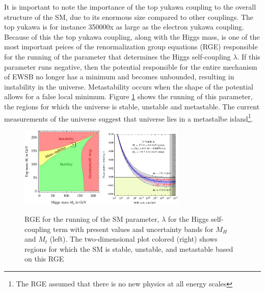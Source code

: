 It is important to note the importance of the top yukawa coupling
to the overall structure of the SM, due to its enormous size compared
to other couplings. The top yukawa is for instance 350000x as large as the electron
yukawa coupling. Because of this the top yukawa coupling,
along with the Higgs mass, is one of the most important peices of the renormalization group equations (RGE)
responsible for the running of the parameter that determines the Higgs self-coupling $\lambda$. 
If this parameter runs negative, then the potential responsible for the entire mechanism 
of EWSB no longer has a minimum and becomes unbounded, resulting in instability in the universe.
Metastability occurs when the shape of the potential allows for a false local minimum.
Figure \ref{figure:theory_stability} shows the running of this parameter, the regions
for which the universe is stable, unstable and metastable. The current
measurements of the universe suggest that universe lies in a metastalbe island\footnote{The
RGE assumed that there is no new physics at all energy scales}.


\begin{figure}[!t]
\centering 
\includegraphics[width=0.35\textwidth]{figs/SMstability.pdf}
\includegraphics[width=0.35\textwidth]{figs/runLambda.pdf}
\caption {
  RGE for the running of the SM parameter, $\lambda$ for the Higgs self-coupling term 
  with present values and uncertainty bands for $M_H$ and $M_t$ (left). The two-dimensional
  plot colored (right) shows regions for which the SM is stable, unstable, and metastable
  based on this RGE}

\label{figure:theory_stability}

\end{figure}



